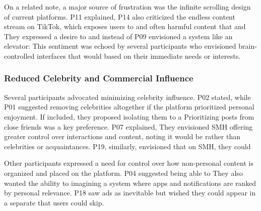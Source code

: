On a related note, a major source of frustration was the infinite scrolling design of current platforms. P11 explained,  P14 also criticized the endless content stream on TikTok, which exposes users to  and often harmful content that  and  They expressed a desire to  and  instead of  P09 envisioned a system like an elevator:  This sentiment was echoed by several participants who envisioned brain-controlled interfaces that would  based on their immediate needs or interests.

\subsubsection{Reduced Celebrity and Commercial Influence}
\label{lab:4-5-2}
Several participants advocated minimizing celebrity influence. P02 stated,  while P01 suggested removing celebrities altogether if the platform prioritized personal enjoyment. If included, they proposed isolating them to a  Prioritizing posts from close friends was a key preference. P07 explained,  They envisioned SMH offering greater control over interactions and content, noting it would be  rather than celebrities or acquaintances. P19, similarly, envisioned that on SMH, they could 

Other participants expressed a need for control over how non-personal content is organized and placed on the platform. P04 suggested being able to  They also wanted the ability to  imagining a system where apps and notifications are ranked by personal relevance. P18 saw ads as inevitable but wished they could appear in a separate  that users could skip.

